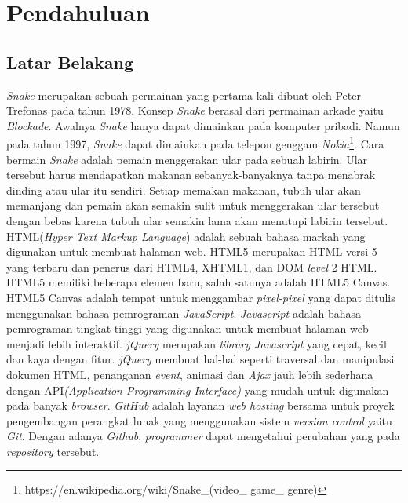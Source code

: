 \chapter{Pendahuluan}
\label{chap:intro}
   
\section{Latar Belakang}
\label{sec:label}

\textit{Snake} merupakan sebuah permainan yang pertama kali dibuat oleh Peter Trefonas pada tahun 1978. Konsep \textit{Snake} berasal dari permainan arkade yaitu \textit{Blockade}. Awalnya \textit{Snake} hanya dapat dimainkan pada komputer pribadi. Namun pada tahun 1997, \textit{Snake} dapat dimainkan pada telepon genggam \textit{Nokia}\footnote{https://en.wikipedia.org/wiki/Snake\_(video\_ game\_ genre)}. Cara bermain \textit{Snake} adalah pemain menggerakan ular pada sebuah labirin. Ular tersebut harus mendapatkan makanan sebanyak-banyaknya tanpa menabrak dinding atau ular itu sendiri. Setiap memakan makanan, tubuh ular akan memanjang dan pemain akan semakin sulit untuk menggerakan ular tersebut dengan bebas karena tubuh ular semakin lama akan menutupi labirin tersebut. \\

HTML(\textit{Hyper Text Markup Language}) adalah sebuah bahasa markah yang digunakan untuk membuat halaman web. HTML5 merupakan HTML versi 5 yang terbaru dan penerus dari HTML4, XHTML1, dan DOM \textit{level} 2 HTML. HTML5 memiliki beberapa elemen baru, salah satunya adalah HTML5 Canvas. HTML5 Canvas adalah tempat untuk menggambar \textit{pixel-pixel} yang dapat ditulis menggunakan bahasa pemrograman \textit{JavaScript}. \textit{Javascript} adalah bahasa pemrograman tingkat tinggi yang digunakan untuk membuat halaman web menjadi lebih interaktif. \textit{jQuery} merupakan \textit{library Javascript} yang cepat, kecil dan kaya dengan fitur. \textit{jQuery} membuat hal-hal seperti traversal dan manipulasi dokumen HTML, penanganan \textit{event}, animasi dan \textit{Ajax} jauh lebih sederhana dengan API\textit{(Application Programming Interface)} yang mudah untuk digunakan pada banyak \textit{browser}. \textit{GitHub} adalah layanan \textit{web hosting} bersama untuk proyek pengembangan perangkat lunak yang menggunakan sistem \textit{version control} yaitu \textit{Git}. Dengan adanya \textit{Github}, \textit{programmer} dapat mengetahui perubahan yang pada \textit{repository} tersebut. \\

